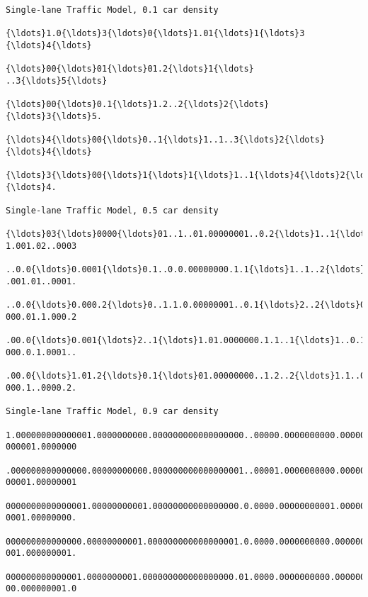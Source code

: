 \documentclass[11pt]{article}
\begin{document}
    \begin{Verbatim}[commandchars=\\\{\},fontsize=\footnotesize]
Single-lane Traffic Model, 0.1 car density

{\ldots}1.0{\ldots}3{\ldots}0{\ldots}1.01{\ldots}1{\ldots}3
{\ldots}4{\ldots}

{\ldots}00{\ldots}01{\ldots}01.2{\ldots}1{\ldots}
..3{\ldots}5{\ldots}

{\ldots}00{\ldots}0.1{\ldots}1.2..2{\ldots}2{\ldots}
{\ldots}3{\ldots}5.

{\ldots}4{\ldots}00{\ldots}0..1{\ldots}1..1..3{\ldots}2{\ldots}
{\ldots}4{\ldots}

{\ldots}3{\ldots}00{\ldots}1{\ldots}1{\ldots}1..1{\ldots}4{\ldots}2{\ldots}
{\ldots}4.

Single-lane Traffic Model, 0.5 car density

{\ldots}03{\ldots}0000{\ldots}01..1..01.00000001..0.2{\ldots}1..1{\ldots}0005{\ldots}0.0.2..01.2..1.0.001.0.0
1.001.02..0003

..0.0{\ldots}0.0001{\ldots}0.1..0.0.00000000.1.1{\ldots}1..1..2{\ldots}000{\ldots}00.0{\ldots}01.1..1.00.01.01.1
.001.01..0001.

..0.0{\ldots}0.000.2{\ldots}0..1.1.0.00000001..0.1{\ldots}2..2{\ldots}0.000{\ldots}01.1{\ldots}1.1.2..001.0.01.1.
000.01.1.000.2

.00.0{\ldots}0.001{\ldots}2..1{\ldots}1.01.0000000.1.1..1{\ldots}1..0.1.000{\ldots}1.1.2{\ldots}1.2..001.01.0.1.0
000.0.1.0001..

.00.0{\ldots}1.01.2{\ldots}0.1{\ldots}01.00000000..1.2..2{\ldots}1.1..0001{\ldots}0.2..1..2..001.00.01..00
000.1..0000.2.

Single-lane Traffic Model, 0.9 car density

1.000000000000001.0000000000.000000000000000000..00000.0000000000.00000000001.0000.000
000001.0000000

.000000000000000.00000000000.000000000000000001..00001.0000000000.0000000001.00000.000
00001.00000001

0000000000000001.00000000001.00000000000000000.0.0000.00000000001.000000000.000001.000
0001.00000000.

000000000000000.00000000001.000000000000000001.0.0000.0000000000.0000000000.00000.0000
001.000000001.

000000000000001.0000000001.000000000000000000.01.0000.0000000000.0000000000.00001.0000
00.000000001.0


    \end{Verbatim}
\end{document}
